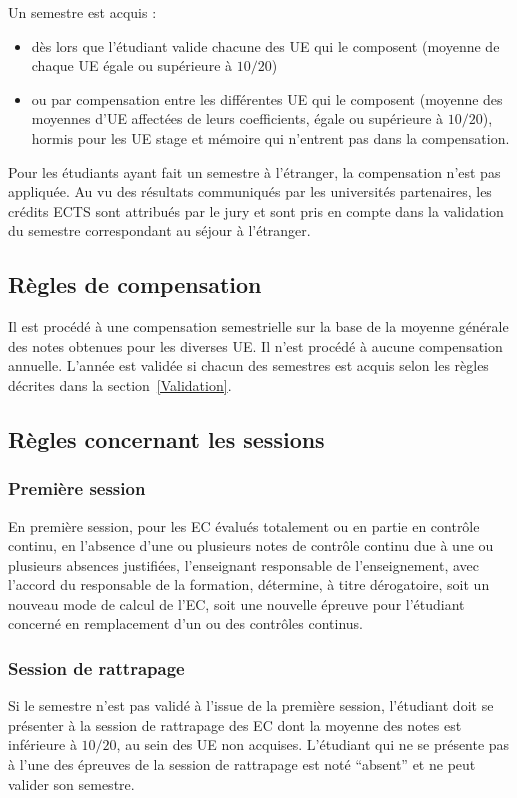 \documentclass[a4paper,11pt]{article}
\begin{document}
Un semestre est acquis :
\begin{itemize}
	\item dès lors que l'étudiant valide chacune des UE qui le composent (moyenne de chaque UE égale ou supérieure à $10/20$)
	\item ou par compensation entre les différentes UE qui le composent (moyenne des moyennes d'UE affectées de leurs coefficients, égale ou supérieure à $10/20$), hormis pour les UE stage et mémoire qui n'entrent pas dans la compensation.
\end{itemize}

Pour les étudiants ayant fait un semestre à l'étranger, la compensation n'est pas appliquée. Au vu des résultats communiqués par les universités partenaires, les crédits ECTS sont attribués par le jury et sont pris en compte dans la validation du semestre correspondant au séjour à l'étranger.



\subsection{Règles de compensation}
Il est procédé à une compensation semestrielle sur la base de la moyenne générale des notes obtenues pour les diverses UE.
Il n'est procédé à aucune compensation annuelle. L'année est validée si chacun des semestres est acquis selon les règles décrites dans la section~\ref{Validation}.



\subsection{Règles concernant les sessions}
\subsubsection{Première session}
En première session, pour les EC évalués totalement ou en partie en contrôle continu, en l'absence d'une ou plusieurs notes de contrôle continu due à une ou plusieurs absences justifiées, l'enseignant responsable de l'enseignement, avec l'accord du responsable de la formation, détermine, à titre dérogatoire, soit un nouveau mode de calcul de l'EC, soit une nouvelle épreuve pour l'étudiant concerné en remplacement d'un ou des contrôles continus.

\subsubsection{Session de rattrapage}
Si le semestre n'est pas validé à l'issue de la première session, l'étudiant doit se présenter à la session de rattrapage des EC dont la moyenne des notes est inférieure à $10/20$, au sein des UE non acquises. L'étudiant qui ne se présente pas à l'une des épreuves de la session de rattrapage est noté ``absent'' et ne peut valider son semestre.
\end{document}
